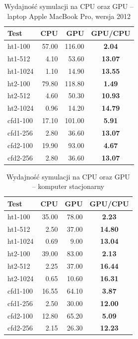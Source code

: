 \begin{table}[!htp]
\caption{Wydajność symulacji na CPU oraz GPU -- laptop Apple MacBook Pro, 
wersja 2012}
\centering
\begin{tabular}{|l|r|r|>{\bfseries}c|}
\hline
\cellcolor{t} Test & \cellcolor{cpu} CPU & \cellcolor{gpu} GPU & \cellcolor{gc} GPU/CPU \\ \hline
ht1-100 & 57.00 & 116.00 & 2.04 \\ \hline
ht1-512 & 4.10 & 53.60 & 13.07 \\ \hline
ht1-1024 & 1.10 & 14.90 & 13.55 \\ \hline
ht2-100 & 79.80 & 118.80 & 1.49 \\ \hline
ht2-512 & 4.60 & 50.30 & 10.93 \\ \hline
ht2-1024 & 0.96 & 14.20 & 14.79 \\ \hline
\hline
cfd1-100 & 17.10 & 101.00 & 5.91 \\ \hline
cfd1-256 & 2.80 & 36.60 & 13.07 \\ \hline
cfd2-100 & 19.90 & 93.00 & 4.67 \\ \hline
cfd2-256 & 2.80 & 36.60 & 13.07 \\ \hline
\end{tabular}
\label{tab:wynikiWebGL_3}
\end{table}

\begin{table}[!htp]
\caption{Wydajność symulacji na CPU oraz GPU -- komputer stacjonarny}
\centering
\begin{tabular}{|l|r|r|>{\bfseries}c|}
\hline
\cellcolor{t} Test & \cellcolor{cpu} CPU & \cellcolor{gpu} GPU & \cellcolor{gc} GPU/CPU \\ \hline
ht1-100 & 35.00 & 78.00 & 2.23 \\ \hline
ht1-512 & 2.50 & 37.00 & 14.80 \\ \hline
ht1-1024 & 0.69 & 9.00 & 13.04 \\ \hline
ht2-100 & 39.00 & 83.00 & 2.13 \\ \hline
ht2-512 & 2.25 & 37.00 & 16.44 \\ \hline
ht2-1024 & 0.65 & 10.60 & 16.31 \\ \hline
\hline
cfd1-100 & 16.55 & 64.10 & 3.87 \\ \hline
cfd1-256 & 2.50 & 30.00 & 12.00 \\ \hline
cfd2-100 & 12.80 & 65.20 & 5.09 \\ \hline
cfd2-256 & 2.15 & 26.30 & 12.23 \\ \hline
\end{tabular}
\label{tab:wynikiWebGL_last}
\end{table}

